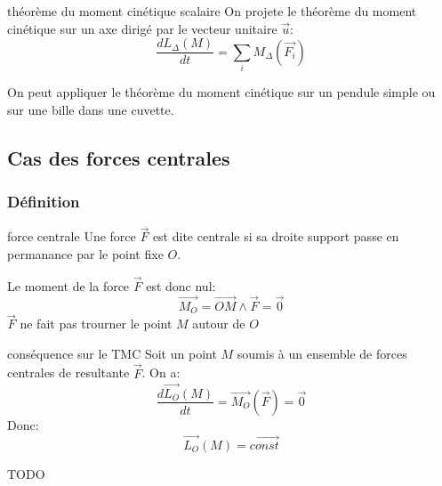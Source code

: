 \begin{theorem}{théorème du moment cinétique scalaire}{}
    On projete le théorème du moment cinétique sur un axe dirigé
    par le vecteur unitaire $\vec{u}$:
    \[\frac{dL_{\Delta}(M)}{dt} = \sum_{i} M_{\Delta}(\vec{F_{i}})\]
\end{theorem}

\begin{example}{}{}
    On peut appliquer le théorème du moment cinétique sur un pendule simple ou 
    sur une bille dans une cuvette.
\end{example}


\subsection{Cas des forces centrales}
\subsubsection{Définition}

\begin{definition}{force centrale}{}
    Une force $\vec{F}$ est dite centrale si sa droite support passe 
    en permanance par le point fixe $O$.
\end{definition}

\begin{conseq}{}{}
    Le moment de la force $\vec{F}$ est donc nul:
    \[\vec{M_{O}} = \vec{OM} \wedge \vec{F} = \vec{0}\]
    $\vec{F}$ ne fait pas trourner le point $M$ autour de $O$
\end{conseq}

\begin{conseq}{conséquence sur le TMC}{}
    Soit un point $M$ soumis à un ensemble de forces centrales de resultante $\vec{F}$.
    On a:
    \[\frac{d\vec{L_{O}}(M)}{dt} = \vec{M_{O}}(\vec{F}) = \vec{0}\]
    Donc:
    \[\vec{L_{O}}(M) = \vec{const}\]

    TODO
\end{conseq}

